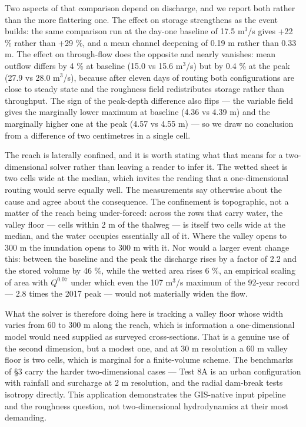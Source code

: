 Two aspects of that comparison depend on discharge, and we report both
rather than the more flattering one. The effect on storage strengthens
as the event builds: the same comparison run at the day-one baseline of
17.5 m$^{3}$/s gives +22 \% rather than +29 \%, and a mean channel deepening
of 0.19 m rather than 0.33 m. The effect on through-flow does the
opposite and nearly vanishes: mean outflow differs by 4 \% at baseline
(15.0 vs 15.6 m$^{3}$/s) but by 0.4 \% at the peak (27.9 vs 28.0 m$^{3}$/s),
because after eleven days of routing both configurations are close to
steady state and the roughness field redistributes storage rather than
throughput. The sign of the peak-depth difference also flips --- the
variable field gives the marginally lower maximum at baseline (4.36 vs
4.39 m) and the marginally higher one at the peak (4.57 vs 4.55 m) ---
so we draw no conclusion from a difference of two centimetres in a
single cell.

The reach is laterally confined, and it is worth stating what that means
for a two-dimensional solver rather than leaving a reader to infer it.
The wetted sheet is two cells wide at the median, which invites the
reading that a one-dimensional routing would serve equally well. The
measurements say otherwise about the cause and agree about the
consequence. The confinement is topographic, not a matter of the reach
being under-forced: across the rows that carry water, the valley floor
--- cells within 2 m of the thalweg --- is itself two cells wide at the
median, and the water occupies essentially all of it. Where the valley
opens to 300 m the inundation opens to 300 m with it. Nor would a larger
event change this: between the baseline and the peak the discharge rises
by a factor of 2.2 and the stored volume by 46 \%, while the wetted area
rises 6 \%, an empirical scaling of area with \(Q^{0.07}\) under which
even the 107 m$^{3}$/s maximum of the 92-year record --- 2.8 times the 2017
peak --- would not materially widen the flow.

What the solver is therefore doing here is tracking a valley floor whose
width varies from 60 to 300 m along the reach, which is information a
one-dimensional model would need supplied as surveyed cross-sections.
That is a genuine use of the second dimension, but a modest one, and at
30 m resolution a 60 m valley floor is two cells, which is marginal for
a finite-volume scheme. The benchmarks of §3 carry the harder
two-dimensional cases --- Test 8A is an urban configuration with
rainfall and surcharge at 2 m resolution, and the radial dam-break tests
isotropy directly. This application demonstrates the GIS-native input
pipeline and the roughness question, not two-dimensional hydrodynamics
at their most demanding.

